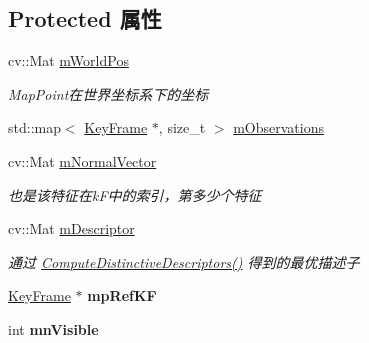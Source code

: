 \subsection*{Protected 属性}
\begin{DoxyCompactItemize}
\item 
\hypertarget{classORB__SLAM2_1_1MapPoint_a39741adada8dcd302afbf45ec2e72af0}{cv\-::\-Mat \hyperlink{classORB__SLAM2_1_1MapPoint_a39741adada8dcd302afbf45ec2e72af0}{m\-World\-Pos}}\label{classORB__SLAM2_1_1MapPoint_a39741adada8dcd302afbf45ec2e72af0}

\begin{DoxyCompactList}\small\item\em Map\-Point在世界坐标系下的坐标 \end{DoxyCompactList}\item 
std\-::map$<$ \hyperlink{classORB__SLAM2_1_1KeyFrame}{Key\-Frame} $\ast$, size\-\_\-t $>$ \hyperlink{classORB__SLAM2_1_1MapPoint_a189bea541f860af75ceb60300b59d8e3}{m\-Observations}
\item 
\hypertarget{classORB__SLAM2_1_1MapPoint_aba0cff72e2182ff72d32edd77dc7832d}{cv\-::\-Mat \hyperlink{classORB__SLAM2_1_1MapPoint_aba0cff72e2182ff72d32edd77dc7832d}{m\-Normal\-Vector}}\label{classORB__SLAM2_1_1MapPoint_aba0cff72e2182ff72d32edd77dc7832d}

\begin{DoxyCompactList}\small\item\em 也是该特征在k\-F中的索引，第多少个特征 \end{DoxyCompactList}\item 
\hypertarget{classORB__SLAM2_1_1MapPoint_ac2a05b8ddc806ecc6939f42d13828876}{cv\-::\-Mat \hyperlink{classORB__SLAM2_1_1MapPoint_ac2a05b8ddc806ecc6939f42d13828876}{m\-Descriptor}}\label{classORB__SLAM2_1_1MapPoint_ac2a05b8ddc806ecc6939f42d13828876}

\begin{DoxyCompactList}\small\item\em 通过 \hyperlink{classORB__SLAM2_1_1MapPoint_ab4c3dfd8f5f05a4b1888021f1fac3d84}{Compute\-Distinctive\-Descriptors()} 得到的最优描述子 \end{DoxyCompactList}\item 
\hypertarget{classORB__SLAM2_1_1MapPoint_a27cc4fee44b1ae77b24a8c766c617058}{\hyperlink{classORB__SLAM2_1_1KeyFrame}{Key\-Frame} $\ast$ {\bfseries mp\-Ref\-K\-F}}\label{classORB__SLAM2_1_1MapPoint_a27cc4fee44b1ae77b24a8c766c617058}

\item 
\hypertarget{classORB__SLAM2_1_1MapPoint_aadb2c83e36dc01e47983f57e831bac7b}{int {\bfseries mn\-Visible}}\label{classORB__SLAM2_1_1MapPoint_aadb2c83e36dc01e47983f57e831bac7b}


\end{DoxyCompactItemize}
